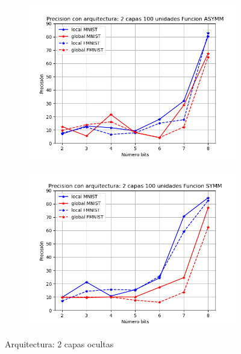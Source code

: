 \begin{figure}[H]
\begin{subfigure}[H]{0.475\textwidth}
    \end{subfigure}
    \begin{subfigure}[H]{0.475\textwidth}
    \includegraphics[width=\textwidth]{imagenes/HSIC/Precision con arquitectura: 2 capas 100 unidades Funcion ASYMM.png}
    \end{subfigure}
    \begin{subfigure}[H]{0.475\textwidth}
    \includegraphics[width=\textwidth]{imagenes/HSIC/Precision con arquitectura: 2 capas 100 unidades Funcion SYMM.png}
    \end{subfigure}
    \caption{Arquitectura: 2 capas ocultas}
\end{figure}

